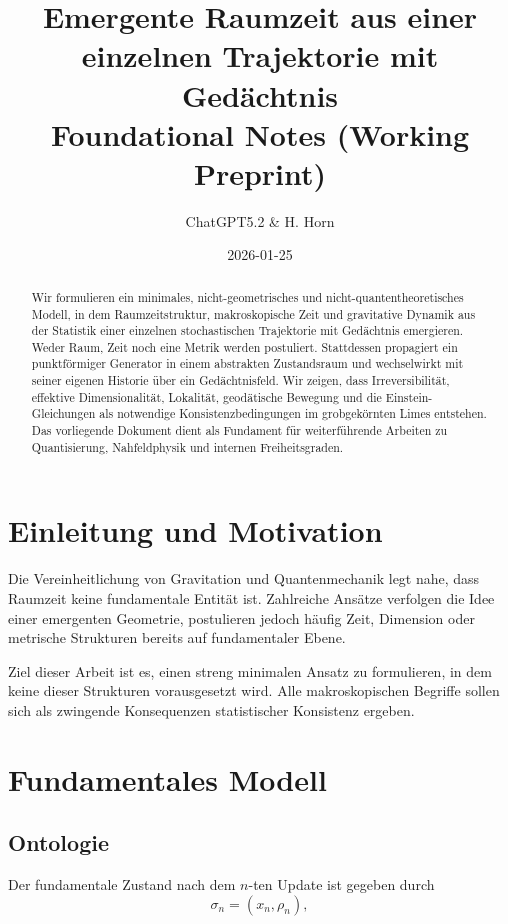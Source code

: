 \documentclass[11pt,a4paper]{article}
\title{Emergente Raumzeit aus einer einzelnen Trajektorie mit Gedächtnis \\ \large{Foundational Notes (Working Preprint)}}
\author{ChatGPT5.2 \& H. Horn}
\date{2026-01-25}
\begin{document}
\maketitle

\begin{abstract}
Wir formulieren ein minimales, nicht-geometrisches und nicht-quantentheoretisches Modell, in dem Raumzeitstruktur, makroskopische Zeit und gravitative Dynamik aus der Statistik einer einzelnen stochastischen Trajektorie mit Gedächtnis emergieren. Weder Raum, Zeit noch eine Metrik werden postuliert. Stattdessen propagiert ein punktförmiger Generator in einem abstrakten Zustandsraum und wechselwirkt mit seiner eigenen Historie über ein Gedächtnisfeld. Wir zeigen, dass Irreversibilit\"at, effektive Dimensionalit\"at, Lokalität, geodätische Bewegung und die Einstein-Gleichungen als notwendige Konsistenzbedingungen im grobgek\"ornten Limes entstehen. Das vorliegende Dokument dient als Fundament für weiterführende Arbeiten zu Quantisierung, Nahfeldphysik und internen Freiheitsgraden.
\end{abstract}

\section{Einleitung und Motivation}

Die Vereinheitlichung von Gravitation und Quantenmechanik legt nahe, dass Raumzeit keine fundamentale Entität ist. Zahlreiche Ansätze verfolgen die Idee einer emergenten Geometrie, postulieren jedoch häufig Zeit, Dimension oder metrische Strukturen bereits auf fundamentaler Ebene.

Ziel dieser Arbeit ist es, einen streng minimalen Ansatz zu formulieren, in dem keine dieser Strukturen vorausgesetzt wird. Alle makroskopischen Begriffe sollen sich als zwingende Konsequenzen statistischer Konsistenz ergeben.

\section{Fundamentales Modell}

\subsection{Ontologie}

Der fundamentale Zustand nach dem $n$-ten Update ist gegeben durch
\begin{equation}
\sigma_n = (x_n, \rho_n),
\end{equation}
\end{document}
